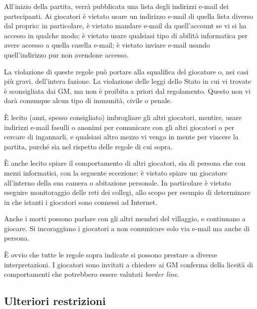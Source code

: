 \documentclass[a4paper,10pt]{article}
\begin{document}
All'inizio della partita, verrà pubblicata una lista degli indirizzi e-mail dei partecipanti. Ai giocatori è vietato usare un indirizzo e-mail di quella lista diverso dal proprio: in particolare, è vietato mandare e-mail da quell'account se vi si ha accesso in qualche modo; è vietato usare qualsiasi tipo di abilità informatica per avere accesso a quella casella e-mail; è vietato inviare e-mail usando quell'indirizzo pur non avendone accesso.

La violazione di queste regole può portare alla squalifica del giocatore o, nei casi più gravi, dell'intera fazione. La violazione delle leggi dello Stato in cui vi trovate è sconsigliata dai GM, ma non è proibita a priori dal regolamento. Questo non vi darà comunque alcun tipo di immunità, civile o penale.

È lecito (anzi, spesso consigliato) imbrogliare gli altri giocatori, mentire, usare indirizzi e-mail fasulli o anonimi per comunicare con gli altri giocatori o per cercare di ingannarli, e qualsiasi altro mezzo vi venga in mente per vincere la partita, purché sia nel rispetto delle regole di cui sopra.

È anche lecito spiare il comportamento di altri giocatori, sia di persona che con mezzi informatici, con la seguente eccezione: è vietato spiare un giocatore all'interno della sua camera o abitazione personale. In particolare è vietato eseguire monitoraggio delle reti dei collegi, allo scopo per esempio di determinare in che istanti i giocatori sono connessi ad Internet. %

Anche i morti possono parlare con gli altri membri del villaggio, e continuano a giocare. Si incoraggiano i giocatori a non comunicare solo via e-mail ma anche di persona.

È ovvio che tutte le regole sopra indicate si possono prestare a diverse interpretazioni. I giocatori sono invitati a chiedere ai GM conferma della liceità di comportamenti che potrebbero essere valutati \emph{border line}.


\subsection{Ulteriori restrizioni}
\end{document}
